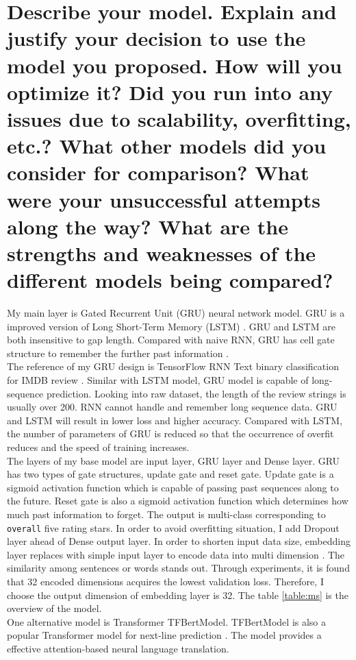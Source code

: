 \documentclass[12pt]{article}
\begin{document}
\section{Describe your model. Explain and justify your decision to use the model you proposed. How
will you optimize it? Did you run into any issues due to scalability, overfitting, etc.? What
other models did you consider for comparison? What were your unsuccessful attempts along
the way? What are the strengths and weaknesses of the different models being compared?} 
My main layer is Gated Recurrent Unit (GRU) neural network model.
GRU is a improved version of Long Short-Term Memory (LSTM) \cite{gru}. GRU and LSTM are both insensitive 
to gap length. Compared with naive RNN, GRU has cell gate structure to remember the further past information \cite{lstm}.\\
The reference of my GRU design is
TensorFlow RNN Text binary classification for IMDB review \cite{Textclassification}. Similar with LSTM model, GRU
model is capable of long-sequence prediction. Looking into raw dataset, the length of the review strings
is usually over 200. RNN cannot handle and remember long sequence data. GRU and LSTM will result in lower loss and 
higher accuracy.
Compared with LSTM, the number of parameters of GRU is reduced so
that the occurrence of overfit reduces and the speed of training increases.\\
The layers of my base model are input layer, GRU layer and Dense layer. 
GRU has two types of gate structures, update gate and reset gate.
Update gate is a sigmoid activation function which is capable of passing past sequences along to the future.
Reset gate is also a sigmoid activation function which determines how much past information to forget.
The output is multi-class corresponding to \texttt{overall} five rating stars. In order to avoid overfitting situation, 
I add Dropout layer ahead of Dense output layer. In order to shorten input data size, embedding layer replaces with simple input layer to encode data into
multi dimension \cite{emd}. The similarity among sentences or words stands out. Through experiments,
it is found that 32 encoded dimensions acquires the lowest validation loss. Therefore, I choose the output
dimension of embedding layer is 32. The table \ref{table:ms} is the overview of the model.\\
One alternative model is Transformer TFBertModel.
TFBertModel is also a popular Transformer model for next-line prediction \cite{BERT, trans}. 
The model provides a effective attention-based neural language translation.
\end{document}
